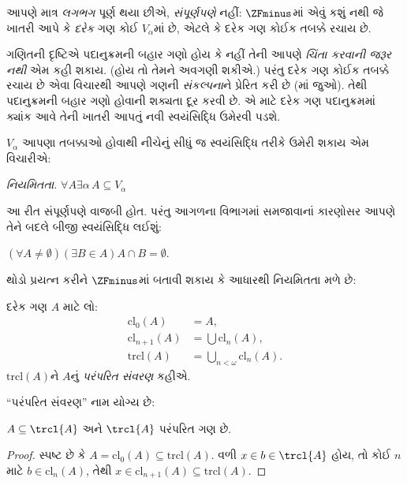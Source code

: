 \begingroup
\makeatletter{}\makeatother


\label{guunit:OLP-0562}


આપણે માત્ર \emph{લગભગ} પૂર્ણ થયા છીએ, \emph{સંપૂર્ણપણે}
નહીં: $\ZFminus$માં એવું કશું નથી જે ખાતરી આપે કે
\emph{દરેક} ગણ કોઈ $V_\alpha$માં છે, એટલે કે દરેક ગણ કોઈક
તબક્કે રચાય છે.

ગણિતની દૃષ્ટિએ પદાનુક્રમની બહાર ગણો હોય કે નહીં તેની આપણે
\emph{ચિંતા કરવાની જરૂર નથી} એમ કહી શકાય. (હોય તો તેમને
અવગણી શકીએ.) પરંતુ દરેક ગણ કોઈક તબક્કે રચાય છે એવા વિચારથી
આપણે ગણની \emph{સંકલ્પના}ને પ્રેરિત કરી છે
(માં \stageshier{} જુઓ). તેથી
પદાનુક્રમની બહાર ગણો હોવાની શક્યતા દૂર કરવી છે. એ માટે
દરેક ગણ પદાનુક્રમમાં ક્યાંક આવે તેની ખાતરી આપતું નવી
સ્વયંસિદ્ધિ ઉમેરવી પડશે.

$V_\alpha$ આપણા તબક્કાઓ હોવાથી નીચેનું સીધું જ સ્વયંસિદ્ધિ
તરીકે ઉમેરી શકાય એમ વિચારીએ:

\begin{defish}
\emph{નિયમિતતા.} $\forall A \exists \alpha\, A \subseteq V_\alpha$
\end{defish}

આ રીત સંપૂર્ણપણે વાજબી હોત. પરંતુ આગળના વિભાગમાં સમજાવાનાં
કારણોસર આપણે તેને બદલે બીજી સ્વયંસિદ્ધિ લઈશું:

\begin{axiom}[આધાર]
$(\forall A \neq \emptyset)(\exists B \in A)A \cap B = \emptyset$.
\end{axiom}

થોડો પ્રયત્ન કરીને $\ZFminus$માં બતાવી શકાય કે આધારથી
નિયમિતતા મળે છે:
\begin{defn}
દરેક ગણ $A$ માટે લો:
\begin{align*}
	\text{cl}_0(A) &= A,\\
	\text{cl}_{n+1}(A) &= \bigcup \text{cl}_n(A),\\
	\text{trcl}(A) &= \bigcup_{n < \omega} \text{cl}_{n}(A).
\end{align*}
$\text{trcl}(A)$ને $A$નું \emph{પરંપરિત સંવરણ} કહીએ.
\end{defn}
\noindent
``પરંપરિત સંવરણ'' નામ યોગ્ય છે:
\begin{prop}
$A \subseteq \trcl{A}$ અને $\trcl{A}$ પરંપરિત ગણ છે.
\end{prop}

\begin{proof}
સ્પષ્ટ છે કે $A = \text{cl}_0(A) \subseteq \text{trcl}(A)$.
વળી $x
\in b \in \trcl{A}$ હોય, તો કોઈ $n$ માટે
$b \in \text{cl}_n(A)$, તેથી $x
\in \text{cl}_{n+1}(A) \subseteq \text{trcl}(A)$.
\end{proof}

